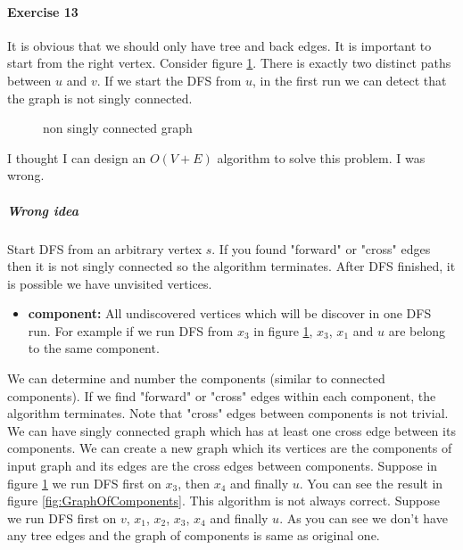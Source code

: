 \documentclass{book}
\begin{document}
	\paragraph{Exercise 13}
	It is obvious that we should only have tree and back edges. It is important to start from the right vertex. Consider figure \ref{fig:NonSinglyConnectedGraph}. There is exactly two distinct paths between $u$ and $v$. If we start the DFS from $u$, in the first run we can detect that the graph is not singly connected.
	\begin{figure}[h!]
		\centering
		\caption{non singly connected graph}
		\label{fig:NonSinglyConnectedGraph}		
	\end{figure}
	I thought I can design an $O(V + E)$ algorithm to solve this problem. I was wrong.
	\subparagraph{Wrong idea}
	Start DFS from an arbitrary vertex $s$. If you found "forward" or "cross" edges then it is not singly connected so the algorithm terminates. After DFS finished, it is possible we have unvisited vertices.
	\begin{itemize}
		\item[] \textbf{component:} All undiscovered vertices which will be discover in one DFS run. For example if we run DFS from $x_3$ in figure \ref{fig:NonSinglyConnectedGraph}, $x_3$, $x_1$ and $u$ are belong to the same component.
	\end{itemize}
	We can determine and number the components (similar to connected components). If we find "forward" or "cross" edges within each component, the algorithm terminates. Note that "cross" edges between components is not trivial. We can have singly connected graph which has at least one cross edge between its components. We can create a new graph which its vertices are the components of input graph and its edges are the cross edges between components. Suppose in figure \ref{fig:NonSinglyConnectedGraph} we run DFS first on $x_3$, then $x_4$ and finally $u$. You can see the result in figure \ref{fig:GraphOfComponents}. This algorithm is not always correct. Suppose we run DFS first on $v$, $x_1$, $x_2$, $x_3$, $x_4$ and finally $u$. As you can see we don't have any tree edges and the graph of components is same as original one.
\end{document}
